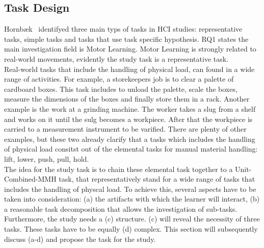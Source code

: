 \subsection{Task Design}
Hornb\ae{}k~\cite{hornbaek} identifyed three main typs of tasks in HCI studies: representative tasks, simple tasks and tasks that use task specific hypothesis. RQ1 states the main investigation field is Motor Learning. Motor Learning is strongly related to real-world movements, evidently the study task is a representative task.\\
Real-world tasks that include the handling of physical load, can found in a wide range of activities. For example, a storekeepers job is to clear a palette of cardboard boxes. This task includes to unload the palette, scale the boxes, measure the dimensions of the boxes and finally store them in a rack. Another example is the work at a grinding machine. The worker takes a slug from a shelf and works on it until the sulg becomes a workpiece. After that the workpiece is carried to a measurement instrument to be varified. There are plenty of other examples, but these two already clarify that a tasks which includes the handling of physical load consitst out of the elemental tasks for manual material handling: lift, lower, push, pull, hold.\\
The idea for the study task is to chain these elemental task together to a Unit-Combined-MMH task, that representatively stand for a wide range of tasks that includes the handling of physcal load. To achieve this, several aspects have to be taken into consideration: (a) the artifacts with which the learner will interact, (b) a reasonable task decomposition that allows the investigation of sub-tasks. Furthermore, the study needs a (c) structure. (c) will reveal the necessity of three tasks. These tasks have to be equally (d) complex. This section will subsequently discuss (a-d) and propose the task for the study.

